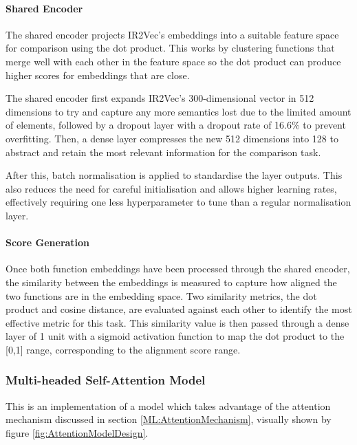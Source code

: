\paragraph{Shared Encoder} The shared encoder projects IR2Vec's embeddings into a suitable feature space for comparison using the dot product. This works by clustering functions that merge well with each other in the feature space so the dot product can produce higher scores for embeddings that are close.

The shared encoder first expands IR2Vec's 300-dimensional vector in 512 dimensions to try and capture any more semantics lost due to the limited amount of elements, followed by a dropout layer with a dropout rate of 16.6\% to prevent overfitting. Then, a dense layer compresses the new 512 dimensions into 128 to abstract and retain the most relevant information for the comparison task.  

After this, batch normalisation is applied to standardise the layer outputs. This also reduces the need for careful initialisation and allows higher learning rates, effectively requiring one less hyperparameter to tune than a regular normalisation layer.

\paragraph{Score Generation}
Once both function embeddings have been processed through the shared encoder, the similarity between the embeddings is measured to capture how aligned the two functions are in the embedding space. Two similarity metrics, the dot product and cosine distance, are evaluated against each other to identify the most effective metric for this task. This similarity value is then passed through a dense layer of 1 unit with a sigmoid activation function to map the dot product to the [0,1] range, corresponding to the alignment score range.

\subsubsection{Multi-headed Self-Attention Model}
This is an implementation of a model which takes advantage of the attention mechanism discussed in section \ref{ML:AttentionMechanism}, visually shown by figure \ref{fig:AttentionModelDesign}.

